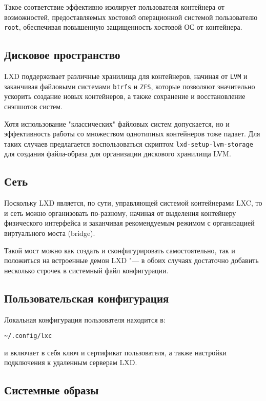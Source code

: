 \documentclass[10pt, a5paper]{article}
\begin{document}
Такое соответствие эффективно изолирует пользователя контейнера от возможностей,
предоставляемых хостовой операционной системой пользователю {\tt root}, обеспечивая
повышенную защищенность хостовой ОС от контейнера.

\subsection*{Дисковое пространство}

{LXD} поддерживает различные хранилища для контейнеров, начиная от {\tt LVM} 
и заканчивая файловыми системами {\tt btrfs} и {\tt ZFS}, которые позволяют 
значительно ускорить создание новых контейнеров, а также сохранение и восстановление 
снэпшотов систем.

Хотя использование "классических" файловых систем допускается, но и эффективность работы со 
множеством однотипных контейнеров тоже падает. Для таких случаев предлагается воспользоваться
скриптом {\tt lxd-setup-lvm-storage} для создания файла-образа для организации дискового
хранилища LVM.

\subsection*{Сеть}

Поскольку {LXD} является, по сути, управляющей системой контейнерами LXC,
то и сеть можно организовать по-разному, начиная от выделения контейнеру 
физического интерфейса и заканчивая рекомендуемым режимом с организацией
виртуального моста (bridge).

Такой мост можно как создать и сконфигурировать самостоятельно, так и положиться на 
встроенные демон {LXD} "--- в обоих случаях достаточно добавить несколько строчек в
системный файл конфигурации.

\subsection*{Пользовательская конфигурация}
Локальная конфигурация пользователя находится в:
\begin{verbatim}
~/.config/lxc
\end{verbatim}
и включает в себя ключ и сертификат пользователя,
а также настройки подключения к удаленным серверам LXD.

\subsection*{Системные образы}
\end{document}
